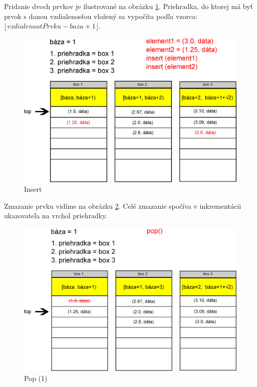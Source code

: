 Pridanie dvoch prvkov je ilustrované na obrázku \ref{fig:priehradky_i}. Priehradka, do ktorej má byť prvok s danou vzdialenosťou vložený sa vypočíta podľa vzorca: $ \lfloor vzdialenostPrvku - baza +1 \rfloor $.


\begin{figure}[h]
\centering
\includegraphics[width=\textwidth]{./img/priehradky_naplnene_default_i.eps}
\caption{Insert}
\label{fig:priehradky_i}
\end{figure}


Zmazanie prvku vidíme na obrázku \ref{fig:priehradky_i_d1}.
Celé zmazanie spočíva v inkrementácii ukazovateľa na vrchol priehradky.
\begin{figure}[h]
\centering
\includegraphics[width=\textwidth]{./img/priehradky_naplnene_default_i_d1.eps}
\caption{Pop (1)}
\label{fig:priehradky_i_d1}
\end{figure}



